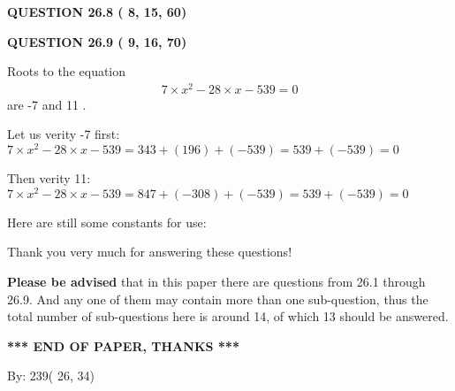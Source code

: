 \documentclass[12pt]{article}
\begin{document}
 
 
  
\vspace{0.2in}
  
{\textbf{\Large{QUESTION
26.8 
 (          8,         15,         60)
}}}
  
  
 
 

 
 
  
\vspace{0.2in}
  
{\textbf{\Large{QUESTION
26.9 
 (          9,         16,         70)
}}}
  
  


 
 

Roots to the equation
\begin{eqnarray*}
7 \times x^2  %
-28
                 \times x    %
-539 =0
\end{eqnarray*}
are  %
-7 and  %
11 .
 
Let us verity  %
-7 first:
$  %
7 \times x^2  %
-28
                 \times x    %
-539
  = %
343+( %
196)+( %
-539)
  = %
539+( %
-539)
  = %
0
$
 
Then verity  %
11:
$  %
7 \times x^2  %
-28
                 \times x    %
-539
  = %
847+( %
-308)+( %
-539)
  = %
539+( %
-539)
  = %
0
$
 
 
 
   
   
 \vspace{0.2in}
Here are still some constants for use:
 
 
 
 
Thank you very much for answering these questions!
 
{\textbf{\large{Please be advised}}} that in this paper there are questions from
26.1 through
26.9.
And any one of them may contain more than one sub-question, thus the total number
of sub-questions here is around 14, of which
13 should be answered.
 
   
   
   
   
\vspace{1.0in} 
{\textbf{\large{ *** END OF PAPER, THANKS *** }}} 
   
   
\hspace{1.0in} By: 
         239(         26,          34)
   
   
   
   
\newpage 
\setcounter{page}{ 
    27001 } 
   
   
   
\end{document}
